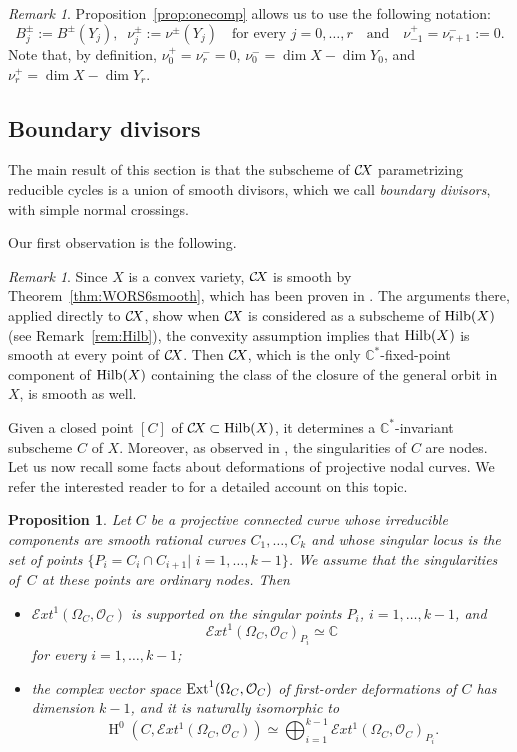 \documentclass[10pt,a4paper]{article}
\numberwithin{equation}{section}
\newtheorem{proposition}[theorem]{Proposition}
\theoremstyle{definition}
\theoremstyle{remark}
\newtheorem{remark}[theorem]{Remark}
\DeclareMathOperator{\HH}{H}
\def\C{{\mathbb C}}
\def\cO{{\mathcal{O}}}
\def\cExt{{\mathcal E}xt}
\def\operatorname#1{\mathop{\rm #1}\nolimits}
\def\Ext{\operatorname{Ext}}
\def\Hilb{\operatorname{Hilb}}
\def\CX{\mathcal{C}\!X\hspace{-0.5pt}}
\begin{document}
\begin{remark}\label{rem:convex} 
 Proposition~\ref{prop:onecomp} allows us to use the following notation:
  \[
  B_j^\pm:=B^\pm(Y_j),\;\; \nu^\pm_j:=\nu^\pm(Y_j)\quad\mbox{for every $j=0, \dots, r$}\quad \mbox{and}\quad \nu^+_{-1}=\nu^-_{r+1}:=0.\] Note that, by definition, $\nu^+_0=\nu^-_r=0$, $\nu^-_0=\dim X-\dim Y_0$, and $\nu^+_r=\dim X-\dim Y_r$.
\end{remark}

\subsection{Boundary divisors}\label{ssec:boundary}


The main result of this section is that the subscheme of $\CX$ parametrizing reducible cycles is a union of smooth divisors, which we call {\em boundary divisors}, with simple normal crossings. 

Our first observation is the following. 

\begin{remark}\label{rem:Hilb2}
Since $X$ is a convex variety, $\CX$  is smooth by Theorem~\ref{thm:WORS6smooth}, which has been proven in \cite[Proposition~6.4]{WORS6}. The arguments there, applied directly to $\CX$, show when $\CX$ is considered as a subscheme of $\Hilb(X)$ (see Remark~\ref{rem:Hilb}), the convexity assumption implies that $\Hilb(X)$ is smooth at every point of $\CX$. Then $\CX$, which is the only $\C^*$-fixed-point component of $\Hilb(X)$ containing the class of the closure of the general orbit in $X$, is smooth as well.
\end{remark}

Given a closed point $[C]$ of $\CX\subset \Hilb(X)$, it determines a $\C^*$-invariant subscheme $C$ of $X$. Moreover, as observed in \cite[Proof of Proposition 6.4]{WORS6}, the singularities of $C$ are nodes. Let us now recall some facts about deformations of projective nodal curves. We refer the interested reader to \cite[Section~6]{Talpo} for a detailed account on this topic.

\begin{proposition}\label{prop:deforms}
Let $C$ be a projective connected curve whose irreducible components are smooth rational curves $C_1,\dots, C_k$ and whose singular locus is the set of points $\{P_i=C_{i}\cap C_{i+1}|\,\,i=1,\dots,k-1\}$. We assume that the singularities of\, $C$ at these points are ordinary nodes. Then 
\begin{itemize}[leftmargin=25pt]
\item $\cExt^1(\Omega_C,\cO_C)$ is supported on the singular points $P_i$, $i=1,\dots,k-1$, and $$\cExt^1(\Omega_C,\cO_C)_{P_i}\simeq \C$$
for every $i=1,\dots,k-1$;
\item the complex vector space $\Ext^1(\Omega_C,\cO_C)$ of first-order deformations of $C$  has dimension $k-1$, and it is naturally isomorphic to
\[
\HH^0(C,\cExt^1(\Omega_C,\cO_C))\simeq \bigoplus_{i=1}^{k-1}\cExt^1(\Omega_C,\cO_C)_{P_i}.
\]
\end{itemize}
\end{proposition}
\end{document}
